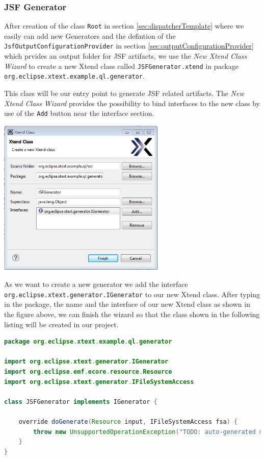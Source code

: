 \subsubsection {JSF Generator}
\label{sec:jsfGenerator}

After creation of the class \texttt{Root} in section
\ref{sec:dispatcherTemplate} where we easily can
add new Generators and the defintion of the
\texttt{JsfOutputConfigurationProvider} in section \ref{sec:outputConfigurationProvider}
which prvides an output folder for JSF
artifacts, we use the \emph{New Xtend Class Wizard} to create a new Xtend class
called \texttt{JSFGenerator.xtend} in package \texttt{org.eclipse.xtext.example.ql.generator}.

This class will be our entry point to generate JSF related artifacts. The
\emph{New Xtend Class Wizard} provides the possibility to bind interfaces to the
new class by use of the \texttt{Add} button near the interface section.

\begin{center}
\includegraphics[width=8cm]{./images/chapter02/newXtendClassWizard.png}
\end{center}

As we want to create a new generator we add the interface
\texttt{org.eclipse.xtext.generator.IGenerator} to our new Xtend class.
After typing in the package, the name and the interface of our new Xtend class
as shown in the figure above, we can finish the
wizard so that the class shown in the following listing
will be created in our project.

\begin{lstlisting}[language=Java] 
package org.eclipse.xtext.example.ql.generator

import org.eclipse.xtext.generator.IGenerator
import org.eclipse.emf.ecore.resource.Resource
import org.eclipse.xtext.generator.IFileSystemAccess

class JSFGenerator implements IGenerator {
	
	override doGenerate(Resource input, IFileSystemAccess fsa) {
		throw new UnsupportedOperationException("TODO: auto-generated method stub")
	}
}
\end{lstlisting}

